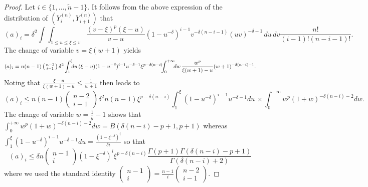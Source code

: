 \begin{proof}
 Let $i\!\in \{1, \ldots, \tilde n-1\}$. It follows from the above expression of the distribution of $(Y^{(n)}_i,Y^{(n)}_{i+1})$ that
\[
 (a)_i = \delta^2 \int\!\!\int_{1\le u\le \xi\le v} \frac{(v-\xi)^p(\xi-u)}{v-u}(1-u^{-\delta})^{i-1}v^{-\delta(n-i-1)}(uv)^{-\delta-1} \,du\,dv \frac{n!}{(i-1)!(n-i-1)!}.
\]
The change of variable $v= \xi(w+1)$   yields
\[
(a)_i =  n(n-1)\left(\begin{smallmatrix} n-2\\i-1\end{smallmatrix}\right)\delta^2 \int_1^{\xi} \hskip -0.15cm du\, (\xi-u)(1-u^{-\delta})^{i-1} u^{-\delta-1} \xi^{p-\delta(n-i)} \hskip -0.15cm  \int_{0}^{+\infty} \hskip -0.15cm  dw\,  \frac{w^p}{\xi(w+1)-u}(w+1)^{-\delta(n-i)-1}.
\]
Noting that $\frac{\xi-u}{\xi(w+1)-u}\le \frac{1}{w+1}$ then leads to
\[
(a)_i \le   n(n-1)\left(\begin{smallmatrix} n-2\\i-1\end{smallmatrix}\right)\delta^2n(n-1)\xi^{p-\delta (n-i)}\int_1^{\xi} \!(1-u^{-\delta})^{i-1} u^{-\delta-1}du \,\times \int _0^{+\infty} \! w^p(1+w)^{-\delta(n-i)-2}dw .
\]
The change of variable $w=\frac{1}{y}-1$ shows that $\displaystyle  \int _0^{+\infty} w^p(1+w)^{-\delta(n-i)-2}dw  = B(\delta(n-i)-p+1, p+1)$ whereas $\displaystyle \int_1^{\xi}  (1-u^{-\delta})^{i-1} u^{-\delta-1} du = \frac{(1-\xi^{-\delta})^i}{\delta i}$ so that
\[
(a)_i \le  \delta n \left(\begin{smallmatrix} n-1\\i\end{smallmatrix}\right) (1-\xi^{-\delta})^i \xi^{p-\delta (n-i)} \frac{\Gamma(p+1)\Gamma(\delta(n-i)-p+1)}{\Gamma(\delta (n-i)+2)}
\]
where we used the standard  identity 
$ \left(\begin{smallmatrix} n-1\\i\end{smallmatrix}\right)= \frac{n-1}{i}\left(\begin{smallmatrix} n-2\\i-1\end{smallmatrix}\right)$. 


\end{proof}

